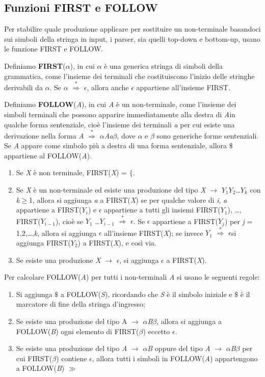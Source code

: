 \subsection{Funzioni FIRST e FOLLOW}
Per stabilire quale produzione applicare per sostituire un non-terminale basandoci sui simboli della stringa in input, i parser, sia quelli top-down e bottom-up, usano le funzione FIRST e FOLLOW.\par
Definiamo \textbf{FIRST}($\alpha$), \cite{libro: compilatori} in cui $\alpha$ è una generica stringa di simboli della grammatica, come l'insieme dei terminali che costituiscono l'inizio delle stringhe derivabili da $\alpha$. Se $\alpha$ $\overset{*}{\Rightarrow}$ $\epsilon$, allora anche $\epsilon$ appartiene all'insieme FIRST.\par
Definiamo \textbf{FOLLOW}(\textit{A}), in cui \textit{A} è un non-terminale, come l'insieme dei simboli terminali che possono apparire immediatamente alla destra di \textit{A}in qualche forma sentenziale, cioè l'insieme dei terminali \textit{a} per cui esiste una derivazione nella forma \textit{A} $\overset{*}{\Rightarrow}$ $\alpha$\textit{Aa}$\beta$, dove $\alpha$ e $\beta$ sono generiche forme sentenziali. Se \textit{A} appare come simbolo più a destra di una forma sentenziale, allora $\$$ appartiene al FOLLOW(\textit{A}).
\begin{enumerate}
	\item Se \textit{X} è non terminale, FIRST(\textit{X}) = $\{$.
	\item Se \textit{X} è un non-terminale ed esiste una produzione del tipo \textit{X} $\to$ $Y_1$$Y_2$\dots$Y_k$ con \textit{k}$\geq$1, allora si aggiunga \textit{a} a FIRST(\textit{X}) se per qualche valore di \textit{i}, \textit{a} appartiene a FIRST(\textit{$Y_i$}) e $\epsilon$ appartiene a tutti gli insiemi FIRST(\textit{$Y_1$}), \dots, FIRST(\textit{$Y_{i-1}$}), cioè se $Y_1$ \dots $Y_{i-1}$ $\overset{*}{\Rightarrow}$ $\epsilon$. Se $\epsilon$ appartiene a FIRST(\textit{$Y_j$}) per \textit{j} = 1,2,\dots,\textit{k}, allora si aggiunga $\epsilon$ all'insieme FIRST(\textit{X}); se invece $Y_1$ $\overset{*}{\Rightarrow}$ $\epsilon$si aggiunga FIRST(\textit{$Y_2$}) a FIRST(\textit{X}), e così via.
	\item Se esiste una produzione \textit{X} $\to$ $\epsilon$, si aggiunga $\epsilon$ a FIRST(\textit{X}). 
\end{enumerate}
Per calcolare FOLLOW(\textit{A}) per tutti i non-terminali \textit{A} si usano le seguenti regole:
\begin{enumerate}
	\item Si aggiunga $\$$ a FOLLOW(\textit{S}), ricordando che \textit{S} è il simbolo iniziale e $\$$ è il marcatore di fine della stringa d'ingresso;
	\item Se esiste una produzione del tipo A $\to$ $\alpha$\textit{B}$\beta$, allora si aggiunga a FOLLOW(\textit{B}) ogni elemento di FIRST($\beta$) eccetto $\epsilon$.
	\item Se esiste una produzione del tipo \textit{A} $\to$ $\alpha$\textit{B} oppure del tipo \textit{A} $\to$ $\alpha$\textit{B}$\beta$ per cui FIRST($\beta$) contiene $\epsilon$, allora tutti i simboli in FOLLOW(\textit{A}) appartengono a FOLLOW(\textit{B}) $\gg$
\end{enumerate}
